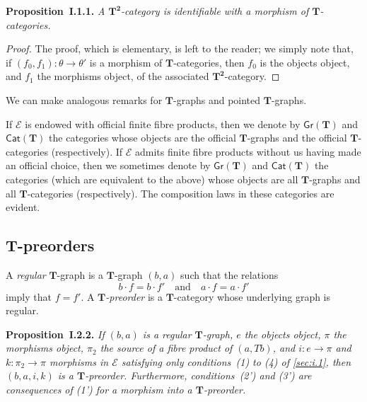 \documentclass[fleqn]{article}
\newenvironment{itenv}[1]
  {\phantomsection\par\medskip\noindent\textbf{#1.}\itshape}
  {\par\medskip}
\newcommand{\oldpage}[1]{\marginpar{\footnotesize$\Big\vert$ \textit{p.~#1}}}
\newcommand{\TT}{\mathbf{T}}
\newcommand{\textand}{\quad\text{and}\quad}
\newcommand{\cat}[1]{\mathcal{#1}}
\newcommand{\Cat}[1]{\mathsf{#1}}
\newcommand{\Gr}[1]{\Cat{Gr}(#1)}
\begin{document}
\begin{itenv}{Proposition~I.1.1}
  A $\TT^\mathbf{2}$-category is identifiable with a morphism of $\TT$-categories.
\end{itenv}

\begin{proof}
  The proof, which is elementary, is left to the reader;
  we simply note that, if $(f_0,f_1)\colon\theta\to\theta'$ is a morphism of $\TT$-categories, then $f_0$ is the objects object, and $f_1$ the morphisms object, of the associated $\TT^\mathbf{2}$-category.
\end{proof}

We can make analogous remarks for $\TT$-graphs and pointed $\TT$-graphs.

\oldpage{229}
If $\cat{E}$ is endowed with official finite fibre products, then we denote by $\Gr{\TT}$ and $\Cat{Cat}(\TT)$ the categories whose objects are the official $\TT$-graphs and the official $\TT$-categories (respectively).
If $\cat{E}$ admits finite fibre products without us having made an official choice, then we sometimes denote by $\Gr{\TT}$ and $\Cat{Cat}(\TT)$ the categories (which are equivalent to the above) whose objects are all $\TT$-graphs and all $\TT$-categories (respectively).
The composition laws in these categories are evident.


\subsection{$\TT$-preorders}
\label{sec:i.2}

A \emph{regular} $\TT$-graph is a $\TT$-graph $(b,a)$ such that the relations
\[
  b\cdot f = b\cdot f'
  \textand
  a\cdot f = a\cdot f'
\]
imply that $f=f'$.
A \emph{$\TT$-preorder} is a $\TT$-category whose underlying graph is regular.

\begin{itenv}{Proposition~I.2.2}
  If $(b,a)$ is a regular $\TT$-graph, $e$ the objects object, $\pi$ the morphisms object, $\pi_2$ the source of a fibre product of $(a,Tb)$, and $i\colon e\to\pi$ and $k\colon\pi_2\to\pi$ morphisms in $\cat{E}$ satisfying only conditions~(1) to (4) of \cref{sec:i.1}, then $(b,a,i,k)$ is a $\TT$-preorder.
  Furthermore, conditions~(2') and (3') are consequences of (1') for a morphism into a $\TT$-preorder.
\end{itenv}
\end{document}
